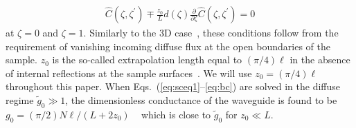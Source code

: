 \begin{eqnarray}
{\hat C}(\zeta,\zeta^{\prime}) \mp
\frac{z_0}{L} d(\zeta) \frac{\partial}{\partial \zeta}
{\hat C}(\zeta,\zeta^{\prime}) = 0
\label{eq:bc}
\end{eqnarray}
at $\zeta = 0$ and $\zeta = 1$. Similarly to the 3D case~\cite{2008_Cherroret}, these conditions follow from the requirement of vanishing incoming diffuse flux at the open boundaries of the sample. $z_0$ is the so-called extrapolation length equal to $(\pi/4)\ell$ in the absence of internal reflections at the sample surfaces~\cite{1999_van_Rossum}. We will use $z_0 = (\pi/4) \ell$ throughout this paper. When Eqs.\ (\ref{eq:sceq1}--\ref{eq:bc}) are solved in the diffuse regime ${\tilde g}_0 \gg 1$, the dimensionless conductance of the waveguide is found to be $g_0 = (\pi/2)N \ell/(L + 2 z_0)$ ~\cite{1999_van_Rossum,1997_Beenakker} which is close to ${\tilde g}_0$ for $z_0 \ll L$.

